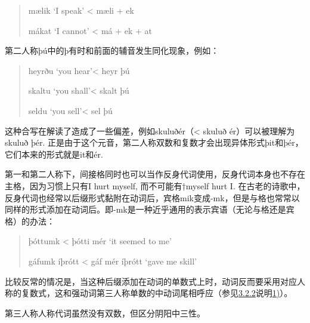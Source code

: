 \begin{quote}
mælik `I speak‌' \textless{} mæli + ek

mákat `I cannot‌' \textless{} má + ek + at
\end{quote}

第二人称þú中的þ有时和前面的辅音发生同化现象，例如：

\begin{quote}
heyrðu `you hear'\textless{} heyr þú

skaltu `you shall'\textless{} skalt þú

seldu `you sell'\textless{} sel þú
\end{quote}

这种合写在解读了造成了一些偏差，例如skuluðér（\textless{} skuluð
ér）可以被理解为skuluð þér.
正是由于这个元音，第二人称双数和复数才会出现异体形式þit和þér，它们本来的形式就是it和ér.

第一和第二人称下，间接格同时也可以当作反身代词使用，反身代词本身也不存在主格，因为习惯上只有I
hurt myself, 而不可能有†myself hurt I.
在古老的诗歌中，反身代词也经常以后缀形式黏附在动词后，宾格mik变成-mk，但是与格也常常以同样的形式添加在动词后。即-mk是一种近乎通用的表示宾语（无论与格还是宾格）的办法：

\begin{quote}
þóttumk \textless{} þótti mér `it seemed to me‌'

gáfumk íþrótt \textless{} gáf mér íþrótt `gave me skill'
\end{quote}

比较反常的情况是，当这种后缀添加在动词的单数式上时，动词反而要采用对应人称的复数式，这和强动词第三人称单数的中动词尾相呼应（参见\hyperref[ux5f3aux52a8ux8bcdux7684ux4e2dux52a8ux8bcdux5c3e]{3.2.2}说明\hyperref[_Ref117719619]{1)}）。

第三人称人称代词虽然没有双数，但区分阴阳中三性。

